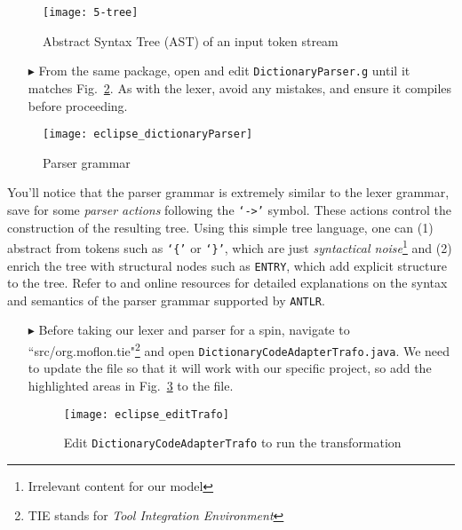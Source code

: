 \vspace{0.5cm}

\begin{figure}[htp]
\begin{center}
 \texttt{[image: 5-tree]}
  \caption{Abstract Syntax Tree (AST) of an input token stream}
  \label{fig:dictLexer}
\end{center}
\end{figure}

\begin{itemize}

\item[$\blacktriangleright$] From the same package, open and edit \texttt{DictionaryParser.g} until it matches Fig.~\ref{eclipse:dictParser}. As with the lexer,
avoid any mistakes, and ensure it compiles before proceeding.

\end{itemize}

\begin{figure}[!htbp]
\begin{center}
 \texttt{[image: eclipse\_dictionaryParser]}
  \caption{Parser grammar}
  \label{eclipse:dictParser}
\end{center}
\end{figure}

You'll notice that the parser grammar is extremely similar to the lexer grammar, save for some \emph{parser actions} following the \texttt{`->'} symbol. These
actions control the construction of the resulting tree. Using this simple tree language, one can (1) abstract from tokens such as \texttt{`\{'} or
\texttt{`\}'}, which are just \emph{syntactical noise}\footnote{Irrelevant content for our model} and (2) enrich the tree with structural nodes such as
\texttt{ENTRY}, which add explicit structure to the tree. Refer to \cite{ANTLR} and online resources for detailed explanations on the syntax and semantics of
the parser grammar supported by \texttt{ANTLR}.

\newpage

\begin{itemize}

\item[$\blacktriangleright$] Before taking our lexer and parser for a spin,
navigate to ``src\-/org\-.mof\-lon\-.tie"\footnote{TIE stands for \emph{Tool
Integration Environment}} and open \texttt{DictionaryCodeAdapterTrafo.java}. We
need to update the file so that it will work with our specific project, so add the highlighted areas in Fig.~\ref{eclipse:defaultTGGMain} to the file.

\vspace{0.5cm}

\begin{figure}[!htbp]
\begin{center}
 \texttt{[image: eclipse\_editTrafo]}
  \caption{Edit \texttt{DictionaryCodeAdapterTrafo} to run the transformation}
  \label{eclipse:defaultTGGMain}
\end{center}
\end{figure}

\end{itemize}

